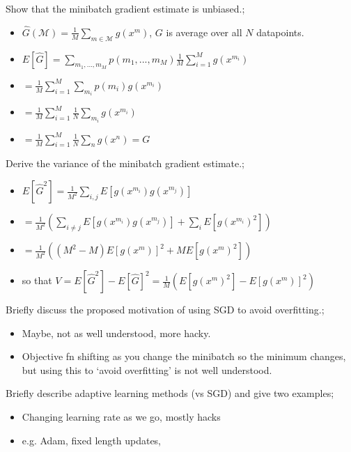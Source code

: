 \documentclass{article}
\begin{document}
Show that the minibatch gradient estimate is unbiased.; \begin{itemize} \item $\hat{G}(\mathcal{M}) = \frac{1}{M}\sum_{m\in\mathcal{M}} g(x^m)$, $G$ is average over all $N$ datapoints.  \item $E[\hat{G}] = \sum_{m_1,...,m_M} p(m_1,...,m_M)\frac{1}{M}\sum_{i=1}^M g(x^{m_i})$ \item $= \frac{1}{M}\sum_{i=1}^M\sum_{m_i} p(m_i)g(x^{m_i})$ \item $=\frac{1}{M}\sum_{i=1}^M\frac{1}{N}\sum_{m_i}g(x^{m_i})$ \item $=\frac{1}{M}\sum_{i=1}^M\frac{1}{N}\sum_{n}g(x^{n})=G$ \end{itemize}

Derive the variance of the minibatch gradient estimate.; \begin{itemize} \item $E[\hat{G}^2] = \frac{1}{M^2}\sum_{i,j}E[g(x^{m_i})g(x^{m_j})]$ \item $=\frac{1}{M^2}(\sum_{i\ne j}E[g(x^{m_i})g(x^{m_j})]+\sum_i E[g(x^{m_i})^2])$ \item $=\frac{1}{M^2}((M^2-M)E[g(x^{m})]^2 + M E[g(x^{m})^2])$ \item so that $V=E[\hat{G}^2]-E[\hat{G}]^2 = \frac{1}{M}(E[g(x^{m})^2]- E[g(x^{m})]^2)$ \end{itemize}

Briefly discuss the proposed motivation of using SGD to avoid overfitting.; \begin{itemize} \item Maybe, not as well understood, more hacky.  \item Objective fn shifting as you change the minibatch so the minimum changes, but using this to `avoid overfitting' is not well understood.  \end{itemize}

Briefly describe adaptive learning methods (vs SGD) and give two examples; \begin{itemize} \item Changing learning rate as we go, mostly hacks \item e.g. Adam, fixed length updates, \end{itemize} 
\end{document}
